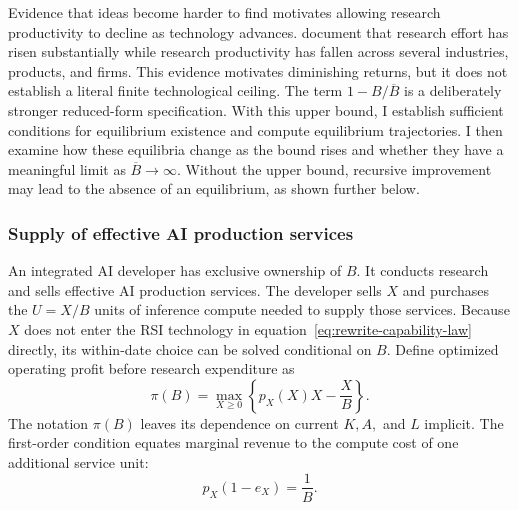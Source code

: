 Evidence that ideas become harder to find motivates allowing research
productivity to decline as technology advances. \citet{bloometal2020} document that research effort has risen substantially while research productivity has fallen across several industries, products, and firms. %
This evidence motivates diminishing returns, but it does not establish a literal finite technological ceiling. The term $1-B/\overline B$ is a deliberately stronger reduced-form specification. With this upper bound, I establish sufficient conditions for equilibrium existence and compute equilibrium trajectories. I then examine how these equilibria change as the bound rises and whether they have a meaningful limit as \(\overline B\to\infty\). Without the upper bound, recursive improvement may lead to the absence of an equilibrium, as shown further below. %

\subsubsection{Supply of effective AI production services}
\label{subsubsec:rewrite-market-structure}

An integrated AI developer has exclusive ownership of $B$. It conducts research
and sells effective AI production services. The developer sells $X$ and purchases the $U=X/B$ units of inference compute needed to supply those services. Because $X$ does not enter the RSI technology in equation~\eqref{eq:rewrite-capability-law}
directly, its within-date choice can be solved conditional on $B$.
Define optimized operating profit before research expenditure as
\begin{equation}
 \pi(B)=\max_{X\geq0}
 \left\{p_X(X)X-\frac{X}{B}\right\}.
 \label{eq:rewrite-service-choice}
\end{equation}
The notation \(\pi(B)\) leaves its dependence on current \(K,A,\) and \(L\) implicit.
The first-order condition equates marginal revenue to the compute cost of one additional service unit:
\begin{equation}
 p_X(1-e_X)=\frac{1}{B}.
 \label{eq:rewrite-monopoly-foc}
\end{equation}

